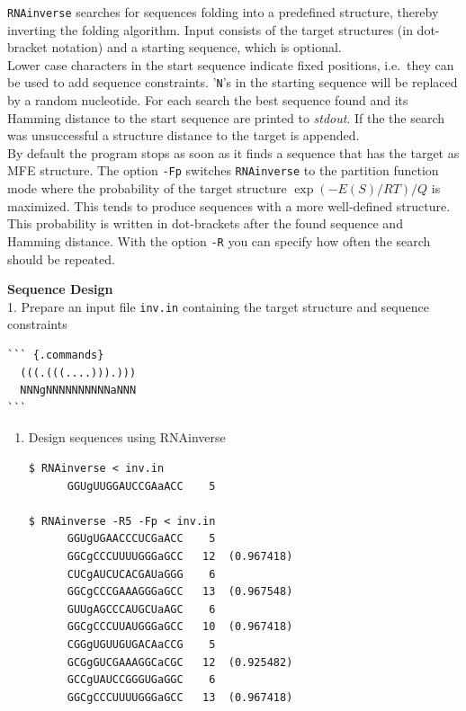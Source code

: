 \documentclass[]{article}
\providecommand{\tightlist}{%
  \setlength{\itemsep}{0pt}\setlength{\parskip}{0pt}}
\begin{document}
\texttt{RNAinverse} searches for sequences folding into a predefined
structure, thereby inverting the folding algorithm. Input consists of
the target structures (in dot-bracket notation) and a starting sequence,
which is optional.\\
Lower case characters in the start sequence indicate fixed positions,
i.e.~they can be used to add sequence constraints. '\texttt{N}'s in the
starting sequence will be replaced by a random nucleotide. For each
search the best sequence found and its Hamming distance to the start
sequence are printed to \emph{stdout}. If the the search was
unsuccessful a structure distance to the target is appended.\\
 By default the program stops as soon as it finds a sequence that has the
target as MFE structure. The option \texttt{-Fp} switches
\texttt{RNAinverse} to the partition function mode where the probability
of the target structure
\(\left. \exp\left( - E\left( S \right)\slash RT \right)\slash Q \right.\)
is maximized. This tends to produce sequences with a more well-defined
structure. This probability is written in dot-brackets after the found
sequence and Hamming distance. With the option \texttt{-R} you can
specify how often the search should be repeated.

\textbf{Sequence Design}\\
1. Prepare an input file \texttt{inv.in} containing the target structure
and sequence constraints

\begin{verbatim}
``` {.commands}
  (((.(((....))).)))
  NNNgNNNNNNNNNNaNNN
```
\end{verbatim}

\begin{enumerate}
\def\labelenumi{\arabic{enumi}.}
\setcounter{enumi}{1}
\tightlist
\item
  Design sequences using RNAinverse

\begin{verbatim}
$ RNAinverse < inv.in
      GGUgUUGGAUCCGAaACC    5

$ RNAinverse -R5 -Fp < inv.in
      GGUgUGAACCCUCGaACC    5
      GGCgCCCUUUUGGGaGCC   12  (0.967418)
      CUCgAUCUCACGAUaGGG    6
      GGCgCCCGAAAGGGaGCC   13  (0.967548)
      GUUgAGCCCAUGCUaAGC    6
      GGCgCCCUUAUGGGaGCC   10  (0.967418)
      CGGgUGUUGUGACAaCCG    5
      GCGgGUCGAAAGGCaCGC   12  (0.925482)
      GCCgUAUCCGGGUGaGGC    6
      GGCgCCCUUUUGGGaGCC   13  (0.967418)
\end{verbatim}
\end{enumerate}
\end{document}
